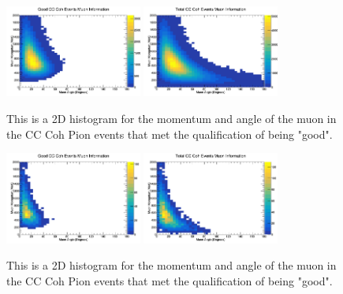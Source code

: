 \documentclass[11pt]{article}
\begin{document}
\begin{figure}[H]
\centering
\includegraphics[width=0.4\textwidth]{NewANMBergerSehgalImages/6-GoodCCCohMuonInfoANMBS.png}
\includegraphics[width=0.4\textwidth]{NewANMBergerSehgalImages/9-TotalCCCohMuonInfoANMBS.png}
\caption{This is a 2D histogram for the momentum and angle of the muon in the CC Coh Pion events that met the qualification of being "good".}
\end{figure}

\begin{figure}[H]
\centering
\includegraphics[width=0.4\textwidth]{NewANMBergerSehgalImages/7.png}
\includegraphics[width=0.4\textwidth]{NewANMBergerSehgalImages/8.png}
\caption{This is a 2D histogram for the momentum and angle of the muon in the CC Coh Pion events that met the qualification of being "good".}
\end{figure}


\end{document}
